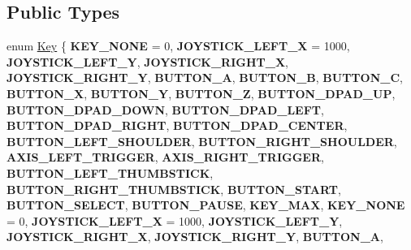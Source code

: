 \subsection*{Public Types}
\begin{DoxyCompactItemize}
\item 
enum \hyperlink{classController_afdf85a1e7a9a3f5943935ac99fb76906}{Key} \{ \newline
{\bfseries K\+E\+Y\+\_\+\+N\+O\+NE} = 0, 
{\bfseries J\+O\+Y\+S\+T\+I\+C\+K\+\_\+\+L\+E\+F\+T\+\_\+X} = 1000, 
{\bfseries J\+O\+Y\+S\+T\+I\+C\+K\+\_\+\+L\+E\+F\+T\+\_\+Y}, 
{\bfseries J\+O\+Y\+S\+T\+I\+C\+K\+\_\+\+R\+I\+G\+H\+T\+\_\+X}, 
\newline
{\bfseries J\+O\+Y\+S\+T\+I\+C\+K\+\_\+\+R\+I\+G\+H\+T\+\_\+Y}, 
{\bfseries B\+U\+T\+T\+O\+N\+\_\+A}, 
{\bfseries B\+U\+T\+T\+O\+N\+\_\+B}, 
{\bfseries B\+U\+T\+T\+O\+N\+\_\+C}, 
\newline
{\bfseries B\+U\+T\+T\+O\+N\+\_\+X}, 
{\bfseries B\+U\+T\+T\+O\+N\+\_\+Y}, 
{\bfseries B\+U\+T\+T\+O\+N\+\_\+Z}, 
{\bfseries B\+U\+T\+T\+O\+N\+\_\+\+D\+P\+A\+D\+\_\+\+UP}, 
\newline
{\bfseries B\+U\+T\+T\+O\+N\+\_\+\+D\+P\+A\+D\+\_\+\+D\+O\+WN}, 
{\bfseries B\+U\+T\+T\+O\+N\+\_\+\+D\+P\+A\+D\+\_\+\+L\+E\+FT}, 
{\bfseries B\+U\+T\+T\+O\+N\+\_\+\+D\+P\+A\+D\+\_\+\+R\+I\+G\+HT}, 
{\bfseries B\+U\+T\+T\+O\+N\+\_\+\+D\+P\+A\+D\+\_\+\+C\+E\+N\+T\+ER}, 
\newline
{\bfseries B\+U\+T\+T\+O\+N\+\_\+\+L\+E\+F\+T\+\_\+\+S\+H\+O\+U\+L\+D\+ER}, 
{\bfseries B\+U\+T\+T\+O\+N\+\_\+\+R\+I\+G\+H\+T\+\_\+\+S\+H\+O\+U\+L\+D\+ER}, 
{\bfseries A\+X\+I\+S\+\_\+\+L\+E\+F\+T\+\_\+\+T\+R\+I\+G\+G\+ER}, 
{\bfseries A\+X\+I\+S\+\_\+\+R\+I\+G\+H\+T\+\_\+\+T\+R\+I\+G\+G\+ER}, 
\newline
{\bfseries B\+U\+T\+T\+O\+N\+\_\+\+L\+E\+F\+T\+\_\+\+T\+H\+U\+M\+B\+S\+T\+I\+CK}, 
{\bfseries B\+U\+T\+T\+O\+N\+\_\+\+R\+I\+G\+H\+T\+\_\+\+T\+H\+U\+M\+B\+S\+T\+I\+CK}, 
{\bfseries B\+U\+T\+T\+O\+N\+\_\+\+S\+T\+A\+RT}, 
{\bfseries B\+U\+T\+T\+O\+N\+\_\+\+S\+E\+L\+E\+CT}, 
\newline
{\bfseries B\+U\+T\+T\+O\+N\+\_\+\+P\+A\+U\+SE}, 
{\bfseries K\+E\+Y\+\_\+\+M\+AX}, 
{\bfseries K\+E\+Y\+\_\+\+N\+O\+NE} = 0, 
{\bfseries J\+O\+Y\+S\+T\+I\+C\+K\+\_\+\+L\+E\+F\+T\+\_\+X} = 1000, 
\newline
{\bfseries J\+O\+Y\+S\+T\+I\+C\+K\+\_\+\+L\+E\+F\+T\+\_\+Y}, 
{\bfseries J\+O\+Y\+S\+T\+I\+C\+K\+\_\+\+R\+I\+G\+H\+T\+\_\+X}, 
{\bfseries J\+O\+Y\+S\+T\+I\+C\+K\+\_\+\+R\+I\+G\+H\+T\+\_\+Y}, 
{\bfseries B\+U\+T\+T\+O\+N\+\_\+A}, 

\end{DoxyCompactItemize}
